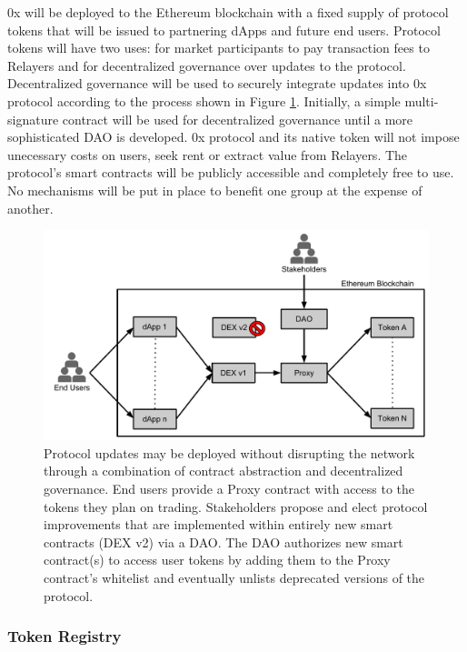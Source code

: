 \documentclass[10pt]{article}
\begin{document}
\noindent 0x will be deployed to the Ethereum blockchain with a fixed supply of protocol tokens that will be issued to partnering dApps and future end users. Protocol tokens will have two uses: for market participants to pay transaction fees to Relayers and for decentralized governance over updates to the protocol. Decentralized governance will be used to securely integrate updates into 0x protocol according to the process shown in Figure \ref{fig:fig4}. Initially, a simple multi-signature contract will be used for decentralized governance until a more sophisticated DAO is developed. 0x protocol and its native token will not impose unecessary costs on users, seek rent or extract value from Relayers. The protocol's smart contracts will be publicly accessible and completely free to use. No mechanisms will be put in place to benefit one group at the expense of another. \\

\begin{figure}[t]
    \centering
    \includegraphics[width=0.8\linewidth]{../figures/fig4.pdf}
    \caption{Protocol updates may be deployed without disrupting the network through a combination of contract abstraction and decentralized governance. End users provide a Proxy contract with access to the tokens they plan on trading. Stakeholders propose and elect protocol improvements that are implemented within entirely new smart contracts (DEX v2) via a DAO. The DAO authorizes new smart contract(s) to access user tokens by adding them to the Proxy contract's whitelist and eventually unlists deprecated versions of the protocol. }
    \label{fig:fig4}
\end{figure}

\pagebreak

\subsubsection{Token Registry}
\end{document}
